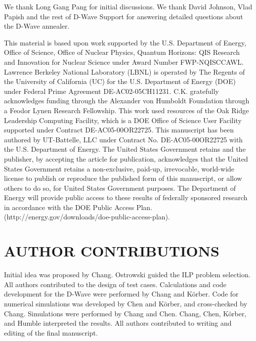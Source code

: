 \documentclass[prd,twocolumn,tightenlines,preprintnumbers,showpacs,superscriptaddress,notitlepage,nofootinbib,eqsecnum,floatfix,longbibliography,aps,10pt]{revtex4-1}
\begin{document}
We thank Long Gang Pang for initial discussions.
We thank David Johnson, Vlad Papish and the rest of D-Wave Support for answering detailed questions about the D-Wave annealer.

This material is based upon work supported by the U.S. Department of Energy, Office of Science, Office of Nuclear Physics, Quantum Horizons: QIS Research and Innovation for Nuclear Science under Award Number FWP-NQISCCAWL.
Lawrence Berkeley National Laboratory (LBNL) is operated by The Regents of the University of California (UC) for the U.S. Department of Energy (DOE) under Federal Prime Agreement DE-AC02-05CH11231.
C.K. gratefully acknowledges funding through the Alexander von Humboldt Foundation through a Feodor Lynen Research Fellowship.
This work used resources of the Oak Ridge Leadership Computing Facility, which is a DOE Office of Science User Facility supported under Contract DE-AC05-00OR22725.
This manuscript has been authored by UT-Battelle, LLC under Contract No. DE-AC05-00OR22725 with the U.S. Department of Energy.
The United States Government retains and the publisher, by accepting the article for publication, acknowledges that the United States Government retains a non-exclusive, paid-up, irrevocable, world-wide license to publish or reproduce the published form of this manuscript, or allow others to do so, for United States Government purposes. The Department of Energy will provide public access to these results of federally sponsored research in accordance with the DOE Public Access Plan. (http://energy.gov/downloads/doe-public-access-plan).


\section{AUTHOR CONTRIBUTIONS}

Initial idea was proposed by Chang.
Ostrowski guided the ILP problem selection.
All authors contributed to the design of test cases.
Calculations and code development for the D-Wave were performed by Chang and K\"orber.
Code for numerical simulations was developed by Chen and K\"orber, and cross-checked by Chang.
Simulations were performed by Chang and Chen.
Chang, Chen, K\"orber, and Humble interpreted the results.
All authors contributed to writing and editing of the final manuscript.

\end{document}
